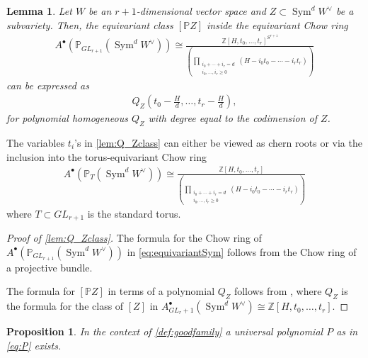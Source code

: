 \documentclass[12 pt]{amsart}
\newtheorem{lemma}{Lemma}[section]
\newtheorem{proposition}{Proposition}[section]
\newcommand{\<}{\left\langle}
\renewcommand{\>}{\right\rangle}
\begin{document}
\begin{lemma}
\label{lem:Q_Zclass}
Let $W$ be an $r+1$-dimensional vector space and $Z\subset \operatorname{Sym}^d W^{\vee}$ be a subvariety. Then, the equivariant class $[\mathbb{P}Z]$ inside the equivariant Chow ring 
\begin{align}
    A^{\bullet}(\mathbb{P}_{GL_{r+1}}(\operatorname{Sym}^d W^{\vee}))\cong \frac{\mathbb{Z}[H, t_0,\ldots,t_{r}]^{S^{r+1}}}{\left(\displaystyle\prod_{\substack{i_0+\cdots+i_{r}=d\\ i_0,\ldots,i_r\geq 0}}(H-i_0 t_0 - \cdots - i_r t_r)\right)}\label{eq:equivariantSym}
\end{align}
can be expressed as
\begin{align*}
    Q_Z(t_0-\frac{H}{d},\ldots,t_{r}-\frac{H}{d}),
\end{align*}
for polynomial homogeneous $Q_Z$ with degree equal to the codimension of $Z$. 
\end{lemma}

The variables $t_i$'s in \autoref{lem:Q_Zclass} can either be viewed as chern roots or via the inclusion into the torus-equivariant Chow ring 
\begin{align*}
    A^{\bullet}(\mathbb{P}_{T}(\operatorname{Sym}^d W^{\vee}))\cong \frac{\mathbb{Z}[H, t_0,\ldots,t_{r}]}{\left(\displaystyle\prod_{\substack{i_0+\cdots+i_{r}=d\\ i_0,\ldots,i_r\geq 0}}(H-i_0 t_0 - \cdots - i_r t_r)\right)}
\end{align*}
where $T\subset GL_{r+1}$ is the standard torus.

\begin{proof}[Proof of \autoref{lem:Q_Zclass}]
The formula for the Chow ring of $A^{\bullet}(\mathbb{P}_{GL_{r+1}}(\operatorname{Sym}^d W^{\vee}))$ in \eqref{eq:equivariantSym} follows from the Chow ring of a projective bundle. %

The formula for $[\mathbb{P}Z]$ in terms of a polynomial $Q_Z$ follows from \cite[Theorem 6.1]{FNR05}, where $Q_Z$ is the formula for the class of $[Z]$ in $A^{\bullet}_{GL_r+1}(\operatorname{Sym}^d W^{\vee})\cong \mathbb{Z}[H, t_0,\ldots,t_{r}]$. 
\end{proof}

\begin{proposition}
In the context of \autoref{def:goodfamily} a universal polynomial $P$ as in \eqref{eq:P} exists.
\end{proposition}
\end{document}
